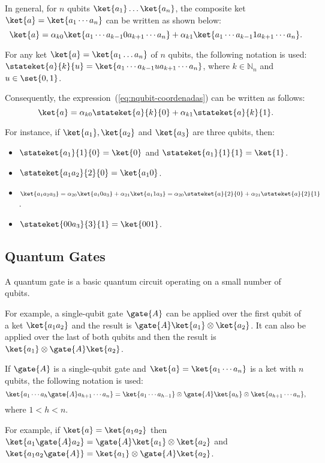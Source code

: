 \documentclass[sigconf,natbib=false]{acmart}
\begin{document}
In general, for $n$ qubits $\ket{a_1}\dots\ket{a_n}$, the composite ket  $\ket{a}=\ket{a_1\cdots a_n}$  can be written as shown below:
\begin{equation}
\label{eq:nqubit-coordenadas}
\ket{a}=\alpha_{k0}\ket{a_1\cdots a_{k-1}0a_{k+1}\cdots a_n}+\alpha_{k1}\ket{a_1\cdots a_{k-1}1a_{k+1}\cdots a_n}.
\end{equation}

\begin{notation}
For any ket $\ket{a}=\ket{a_1\dots a_n}$ of $n$ qubits, the following notation is used:
$\stateket{a}{k}{u} = \ket{a_1\cdots a_{k-1}u a_{k+1}\cdots a_n}$, where $k \in \mathbb{N}_n$ and $u\in\set{0,1}$.
\end{notation}

Consequently, the expression~(\ref{eq:nqubit-coordenadas}) can be written as follows:
\begin{equation}
\label{eq:canonical-state}
\ket{a}= \alpha_{k0}\stateket{a}{k}{0}+\alpha_{k1}\stateket{a}{k}{1}.
\end{equation}

For instance, if $\ket{a_1},\ket{a_2}$ and $\ket{a_3}$ are three qubits, then:
\begin{itemize}
\item $\stateket{a_1}{1}{0}=\ket{0}$ and $\stateket{a_1}{1}{1}=\ket{1}$.
\item $\stateket{a_1 a_2}{2}{0}=\ket{a_1 0}$.
\item $\ket{a_1 a_2 a_3}=\alpha_{20}\ket{a_1 0 a_3}+\alpha_{21}\ket{a_1 1 a_3}=\alpha_{20}\stateket{a}{2}{0}+\alpha_{21}\stateket{a}{2}{1}$.
\item $\stateket{00a_3}{3}{1}=\ket{001}$.
\end{itemize}

\subsection{Quantum Gates}
A quantum gate is a basic quantum circuit operating on a small number of qubits.

For example, a single-qubit gate $\gate{A}$   can be applied over the first qubit of a ket $\ket{a_1a_2} $ and the result is $\gate{A}\ket{a_1}\otimes \ket{a_2}$. It can also be applied over the last of both qubits and then the result is $\ket{a_1}\otimes \gate{A}\ket{a_2}$.

\begin{notation}
If $\gate{A}$ is a single-qubit  gate and $\ket{a}=\ket{a_1\cdots a_n}$ is a ket with $n$ qubits, the following notation is used:
\[\ket{a_1\cdots a_h\gate{A}a_{h+1}\cdots a_n}=\ket{a_1\cdots a_{h-1}}\otimes\gate{A}\ket{a_h}\otimes \ket{a_{h+1}\cdots a_n},\] where $1<h<n$.
\end{notation}
For example, if $\ket{a}=\ket{a_1a_2}$ then
$\ket{a_1\gate{A}a_2} = \gate{A}\ket{a_1}\otimes \ket{a_2}$ and $\ket{a_1a_2\gate{A}} =\ket{a_1}\otimes \gate{A}\ket{a_2}$.
\end{document}
